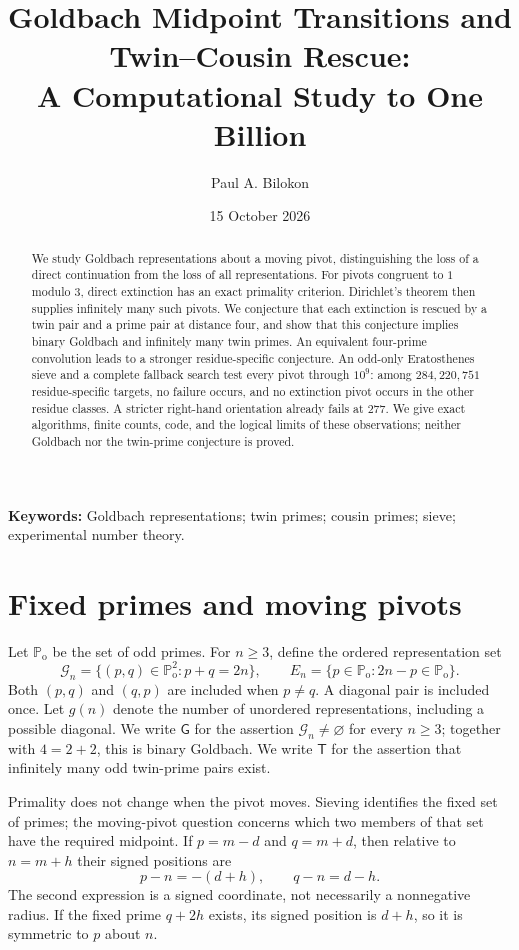 \documentclass[11pt,a4paper]{article}
\title{Goldbach Midpoint Transitions and Twin--Cousin Rescue:\\ A Computational Study to One Billion}
\author{Paul A. Bilokon}
\date{15 October 2026}
\theoremstyle{definition}
\theoremstyle{remark}
\newcommand{\Po}{\mathbb P_{\mathrm{o}}}
\newcommand{\G}{\mathcal G}
\newcommand{\GB}{\mathsf G}
\newcommand{\TP}{\mathsf T}
\begin{document}
\maketitle
\begin{abstract}
We study Goldbach representations about a moving pivot, distinguishing the loss of a direct continuation from the loss of all representations. For pivots congruent to $1$ modulo $3$, direct extinction has an exact primality criterion. Dirichlet's theorem then supplies infinitely many such pivots. We conjecture that each extinction is rescued by a twin pair and a prime pair at distance four, and show that this conjecture implies binary Goldbach and infinitely many twin primes. An equivalent four-prime convolution leads to a stronger residue-specific conjecture. An odd-only Eratosthenes sieve and a complete fallback search test every pivot through $10^9$: among $284{,}220{,}751$ residue-specific targets, no failure occurs, and no extinction pivot occurs in the other residue classes. A stricter right-hand orientation already fails at $277$. We give exact algorithms, finite counts, code, and the logical limits of these observations; neither Goldbach nor the twin-prime conjecture is proved.
\end{abstract}
\noindent\textbf{Keywords:} Goldbach representations; twin primes; cousin primes; sieve; experimental number theory.

\section{Fixed primes and moving pivots}
Let $\Po$ be the set of odd primes. For $n\ge3$, define the ordered representation set
\begin{equation}\label{eq:G}
 \G_n=\{(p,q)\in\Po^2:p+q=2n\},
 \qquad E_n=\{p\in\Po:2n-p\in\Po\}.
\end{equation}
Both $(p,q)$ and $(q,p)$ are included when $p\ne q$. A diagonal pair is included once. Let $g(n)$ denote the number of unordered representations, including a possible diagonal. We write $\GB$ for the assertion $\G_n\ne\varnothing$ for every $n\ge3$; together with $4=2+2$, this is binary Goldbach. We write $\TP$ for the assertion that infinitely many odd twin-prime pairs exist.

Primality does not change when the pivot moves. Sieving identifies the fixed set of primes; the moving-pivot question concerns which two members of that set have the required midpoint. If $p=m-d$ and $q=m+d$, then relative to $n=m+h$ their signed positions are
\[
 p-n=-(d+h),\qquad q-n=d-h.
\]
The second expression is a signed coordinate, not necessarily a nonnegative radius. If the fixed prime $q+2h$ exists, its signed position is $d+h$, so it is symmetric to $p$ about $n$.
\end{document}
